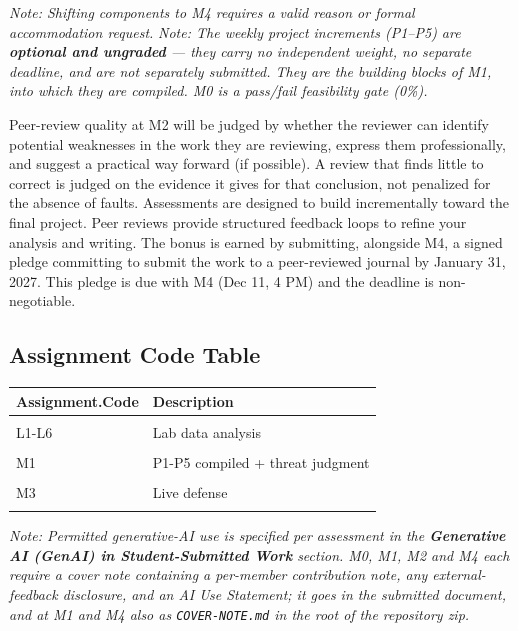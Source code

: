 \documentclass[
]{article}
\begin{document}
\emph{Note: Shifting components to M4 requires a valid reason or formal
accommodation request.} \emph{Note: The weekly project increments
(P1--P5) are \textbf{optional and ungraded} --- they carry no
independent weight, no separate deadline, and are not separately
submitted. They are the building blocks of M1, into which they are
compiled. M0 is a pass/fail feasibility gate (0\%).}

Peer-review quality at M2 will be judged by whether the reviewer can
identify potential weaknesses in the work they are reviewing, express
them professionally, and suggest a practical way forward (if possible).
A review that finds little to correct is judged on the evidence it gives
for that conclusion, not penalized for the absence of faults.
Assessments are designed to build incrementally toward the final
project. Peer reviews provide structured feedback loops to refine your
analysis and writing. The bonus is earned by submitting, alongside M4, a
signed pledge committing to submit the work to a peer-reviewed journal
by January 31, 2027. This pledge is due with M4 (Dec 11, 4 PM) and the
deadline is non-negotiable.

\subsection{Assignment Code Table}\label{assignment-code-table}

\begin{table}[H]
\centering
\begin{tabular}[t]{ll}
\toprule
Assignment.Code & Description\\
\midrule
\cellcolor{gray!10}{M0} & \cellcolor{gray!10}{Paper locked}\\
L1-L6 & Lab data analysis\\
\cellcolor{gray!10}{P1-P5} & \cellcolor{gray!10}{Project increments}\\
M1 & P1-P5 compiled + threat judgment\\
\cellcolor{gray!10}{\textcolor{blue}{M2}} & \cellcolor{gray!10}{Critique of another group's M1}\\
M3 & Live defense\\
\cellcolor{gray!10}{\textcolor{blue}{M4}} & \cellcolor{gray!10}{Final letter + repo}\\
\bottomrule
\end{tabular}
\end{table}

\emph{Note: Permitted generative-AI use is specified per assessment in
the \textbf{Generative AI (GenAI) in Student-Submitted Work} section.
M0, M1, M2 and M4 each require a cover note containing a per-member
contribution note, any external-feedback disclosure, and an AI Use
Statement; it goes in the submitted document, and at M1 and M4 also as
\texttt{COVER-NOTE.md} in the root of the repository zip.}
\end{document}
